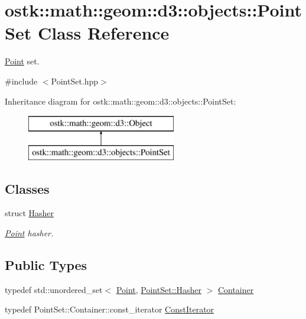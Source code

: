 \hypertarget{classostk_1_1math_1_1geom_1_1d3_1_1objects_1_1_point_set}{}\section{ostk\+:\+:math\+:\+:geom\+:\+:d3\+:\+:objects\+:\+:Point\+Set Class Reference}
\label{classostk_1_1math_1_1geom_1_1d3_1_1objects_1_1_point_set}


\hyperlink{classostk_1_1math_1_1geom_1_1d3_1_1objects_1_1_point}{Point} set.  




{\ttfamily \#include $<$Point\+Set.\+hpp$>$}

Inheritance diagram for ostk\+:\+:math\+:\+:geom\+:\+:d3\+:\+:objects\+:\+:Point\+Set\+:\begin{figure}[H]
\begin{center}
\leavevmode
\includegraphics[height=2.000000cm]{classostk_1_1math_1_1geom_1_1d3_1_1objects_1_1_point_set}
\end{center}
\end{figure}
\subsection*{Classes}
\begin{DoxyCompactItemize}
\item 
struct \hyperlink{structostk_1_1math_1_1geom_1_1d3_1_1objects_1_1_point_set_1_1_hasher}{Hasher}
\begin{DoxyCompactList}\small\item\em \hyperlink{classostk_1_1math_1_1geom_1_1d3_1_1objects_1_1_point}{Point} hasher. \end{DoxyCompactList}\end{DoxyCompactItemize}
\subsection*{Public Types}
\begin{DoxyCompactItemize}
\item 
typedef std\+::unordered\+\_\+set$<$ \hyperlink{classostk_1_1math_1_1geom_1_1d3_1_1objects_1_1_point}{Point}, \hyperlink{structostk_1_1math_1_1geom_1_1d3_1_1objects_1_1_point_set_1_1_hasher}{Point\+Set\+::\+Hasher} $>$ \hyperlink{classostk_1_1math_1_1geom_1_1d3_1_1objects_1_1_point_set_a68a2ddeec07bd422601f60d5ed48e183}{Container}
\item 
typedef Point\+Set\+::\+Container\+::const\+\_\+iterator \hyperlink{classostk_1_1math_1_1geom_1_1d3_1_1objects_1_1_point_set_aa87eb9a571cb8b420e8c404005a2b723}{Const\+Iterator}
\end{DoxyCompactItemize}
